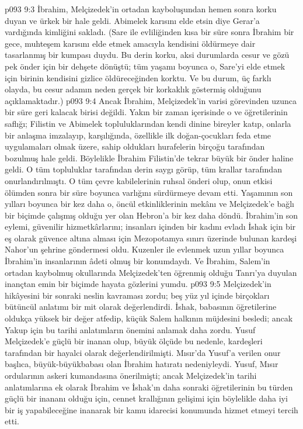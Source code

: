 \vs p093 9:3 İbrahim, Melçizedek’in ortadan kayboluşundan hemen sonra korku duyan ve ürkek bir hale geldi. Abimelek karısını elde etsin diye Gerar’a vardığında kimliğini sakladı. (Sare ile evliliğinden kısa bir süre sonra İbrahim bir gece, muhteşem karısını elde etmek amacıyla kendisini öldürmeye dair tasarlanmış bir kumpası duydu. Bu derin korku, aksi durumlarda cesur ve gözü pek önder için bir dehşete dönüştü; tüm yaşamı boyunca o, Sare’yi elde etmek için birinin kendisini gizlice öldüreceğinden korktu. Ve bu durum, üç farklı olayda, bu cesur adamın neden gerçek bir korkaklık göstermiş olduğunu açıklamaktadır.)
\vs p093 9:4 Ancak İbrahim, Melçizedek’in varisi görevinden uzunca bir süre geri kalacak birisi değildi. Yakın bir zaman içerisinde o ve öğretilerinin saflığı; Filistin ve Abimelek topluluklarından kendi dinine bireyler katıp, onlarla bir anlaşma imzalayıp, karşılığında, özellikle ilk doğan\hyp{}çocukları feda etme uygulamaları olmak üzere, sahip oldukları hurafelerin birçoğu tarafından bozulmuş hale geldi. Böylelikle İbrahim Filistin’de tekrar büyük bir önder haline geldi. O tüm topluluklar tarafından derin saygı görüp, tüm krallar tarafından onurlandırılmıştı. O tüm çevre kabilelerinin ruhsal önderi olup, onun etkisi ölümden sonra bir süre boyunca varlığını sürdürmeye devam etti. Yaşamının son yılları boyunca bir kez daha o, öncül etkinliklerinin mekânı ve Melçizedek’e bağlı bir biçimde çalışmış olduğu yer olan Hebron’a bir kez daha döndü. İbrahim’in son eylemi, güvenilir hizmetkârlarını; insanları içinden bir kadını evladı İshak için bir eş olarak güvence altına alması için Mezopotamya sınırı üzerinde bulunan kardeşi Nahor’un şehrine göndermesi oldu. Kuzenler ile evlenmek uzun yıllar boyunca İbrahim’in insanlarının âdeti olmuş bir konumdaydı. Ve İbrahim, Salem’in ortadan kaybolmuş okullarında Melçizedek’ten öğrenmiş olduğu Tanrı’ya duyulan inançtan emin bir biçimde hayata gözlerini yumdu.
\vs p093 9:5 Melçizedek’in hikâyesini bir sonraki neslin kavraması zordu; beş yüz yıl içinde birçokları bütüncül anlatımı bir mit olarak değerlendirdi. İshak, babasının öğretilerine oldukça yüksek bir değer atfedip, küçük Salem halkının müjdesini besledi; ancak Yakup için bu tarihi anlatımların önemini anlamak daha zordu. Yusuf Melçizedek’e güçlü bir inanan olup, büyük ölçüde bu nedenle, kardeşleri tarafından bir hayalci olarak değerlendirilmişti. Mısır’da Yusuf’a verilen onur başlıca, büyük\hyp{}büyükbabası olan İbrahim hatıratı nedeniyleydi. Yusuf, Mısır ordularının askeri kumandasına önerilmişti; ancak Melçizedek’in tarihi anlatımlarına ek olarak İbrahim ve İshak’ın daha sonraki öğretilerinin bu türden güçlü bir inananı olduğu için, cennet krallığının gelişimi için böylelikle daha iyi bir iş yapabileceğine inanarak bir kamu idarecisi konumunda hizmet etmeyi tercih etti.
